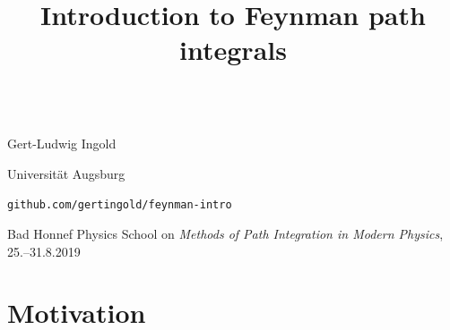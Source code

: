 \documentclass[t,dvipsnames]{beamer}
\title[Introduction to Feynman path integrals]%
      {Introduction to Feynman path integrals}
\begin{document}
\begin{frame}[t]{}
 \vspace{2.0truecm}
 \begin{center}
   \\[0.2truecm]

   \vspace{0.1truecm}
   {\Large Gert-Ludwig Ingold}

   {\large Universität Augsburg}

   \vspace{2.3truecm}
    \texttt{\normalsize github.com/gertingold/feynman-intro}

   \vspace{0.5truecm}
   {\scriptsize Bad Honnef Physics School on \textit{Methods of Path Integration in
    Modern Physics}, 25.--31.8.2019}
 \end{center}
\end{frame}

\navtrue

\section{Motivation}

\begin{frame}[c]{}
 \begin{center}
  \begin{minipage}{0.8\textwidth}
  \end{minipage}
 \end{center}
\end{frame}
\end{document}
